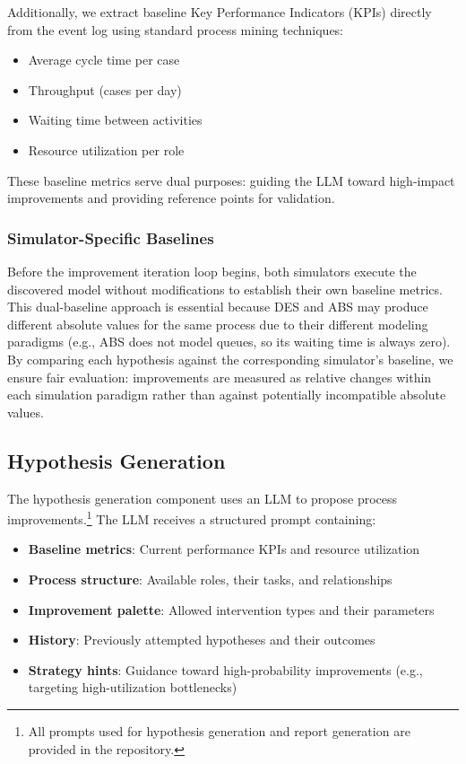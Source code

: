 \documentclass[preprint,12pt]{elsarticle}
\begin{document}
Additionally, we extract baseline Key Performance Indicators (KPIs) directly from the event log using standard process mining techniques:
\begin{itemize}
    \item Average cycle time per case
    \item Throughput (cases per day)
    \item Waiting time between activities
    \item Resource utilization per role
\end{itemize}

These baseline metrics serve dual purposes: guiding the LLM toward high-impact improvements and providing reference points for validation.

\subsubsection{Simulator-Specific Baselines}

Before the improvement iteration loop begins, both simulators execute the discovered model without modifications to establish their own baseline metrics. This dual-baseline approach is essential because DES and ABS may produce different absolute values for the same process due to their different modeling paradigms (e.g., ABS does not model queues, so its waiting time is always zero). By comparing each hypothesis against the corresponding simulator's baseline, we ensure fair evaluation: improvements are measured as relative changes within each simulation paradigm rather than against potentially incompatible absolute values.

\subsection{Hypothesis Generation}

The hypothesis generation component uses an LLM to propose process improvements.\footnote{All prompts used for hypothesis generation and report generation are provided in the repository.} The LLM receives a structured prompt containing:

\begin{itemize}
    \item \textbf{Baseline metrics}: Current performance KPIs and resource utilization
    \item \textbf{Process structure}: Available roles, their tasks, and relationships
    \item \textbf{Improvement palette}: Allowed intervention types and their parameters
    \item \textbf{History}: Previously attempted hypotheses and their outcomes
    \item \textbf{Strategy hints}: Guidance toward high-probability improvements (e.g., targeting high-utilization bottlenecks)
\end{itemize}
\end{document}
